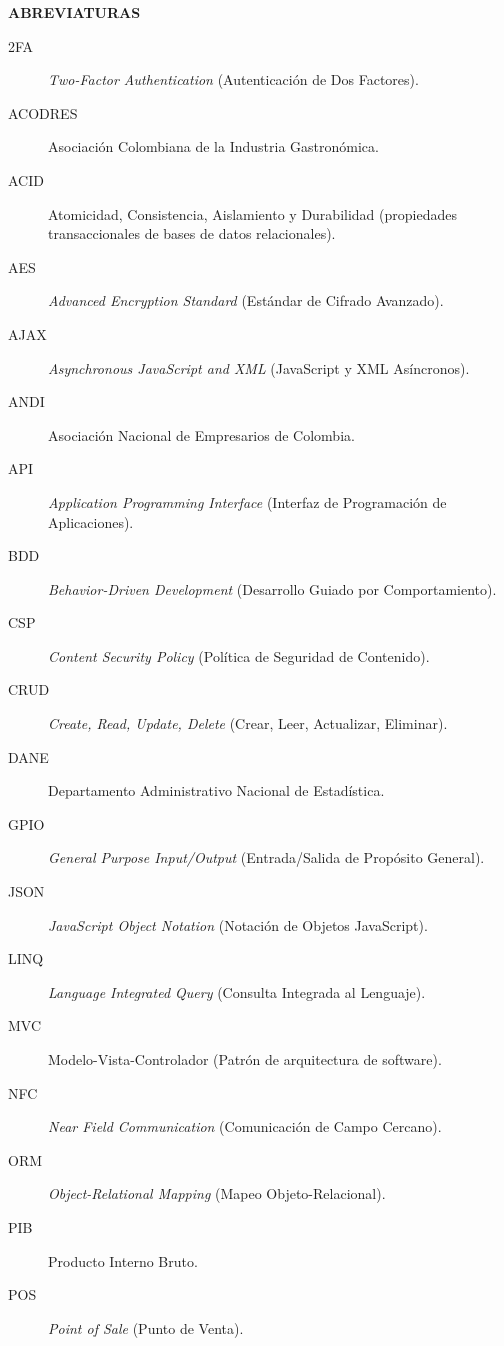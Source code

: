 \newpage
\thispagestyle{empty}

\begin{center}
	{\large\bfseries ABREVIATURAS}
\end{center}

\vspace{1cm}

\begin{description}
	\item[2FA] \textit{Two-Factor Authentication} (Autenticación de Dos Factores).
	\item[ACODRES] Asociación Colombiana de la Industria Gastronómica.
	\item[ACID] Atomicidad, Consistencia, Aislamiento y Durabilidad (propiedades transaccionales de bases de datos relacionales).
	\item[AES] \textit{Advanced Encryption Standard} (Estándar de Cifrado Avanzado).
	\item[AJAX] \textit{Asynchronous JavaScript and XML} (JavaScript y XML Asíncronos).
	\item[ANDI] Asociación Nacional de Empresarios de Colombia.
	\item[API] \textit{Application Programming Interface} (Interfaz de Programación de Aplicaciones).
	\item[BDD] \textit{Behavior-Driven Development} (Desarrollo Guiado por Comportamiento).
	\item[CSP] \textit{Content Security Policy} (Política de Seguridad de Contenido).
	\item[CRUD] \textit{Create, Read, Update, Delete} (Crear, Leer, Actualizar, Eliminar).
	\item[DANE] Departamento Administrativo Nacional de Estadística.
	\item[GPIO] \textit{General Purpose Input/Output} (Entrada/Salida de Propósito General).
	\item[JSON] \textit{JavaScript Object Notation} (Notación de Objetos JavaScript).
	\item[LINQ] \textit{Language Integrated Query} (Consulta Integrada al Lenguaje).
	\item[MVC] Modelo-Vista-Controlador (Patrón de arquitectura de software).
	\item[NFC] \textit{Near Field Communication} (Comunicación de Campo Cercano).
	\item[ORM] \textit{Object-Relational Mapping} (Mapeo Objeto-Relacional).
	\item[PIB] Producto Interno Bruto.
	\item[POS] \textit{Point of Sale} (Punto de Venta).

\end{description}

